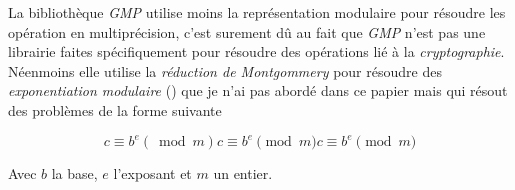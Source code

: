 \documentclass[letterpaper]{article}
\begin{document}
La bibliothèque \emph{GMP} utilise moins la représentation modulaire pour résoudre les
opération en multiprécision, c'est surement dû au fait que \emph{GMP} n'est pas
une librairie faites spécifiquement pour résoudre des opérations lié à la
\emph{cryptographie}. Néenmoins elle utilise la \emph{réduction de Montgommery}
pour résoudre des \emph{exponentiation modulaire} (\cite{gmplibmodularpowering}) que
je n'ai pas abordé dans ce papier mais qui résout des problèmes de la forme
suivante

$$c ≡ b^e (\bmod m ) {\displaystyle c\equiv b^{e}{\pmod {m}}} c\equiv b^{e}{\pmod {m}}$$

Avec $b$ la base, $e$ l'exposant et $m$ un entier.

\footnotesize


\end{document}
